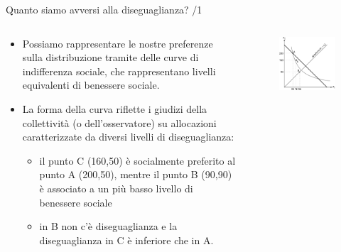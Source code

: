 \documentclass[aspectratio=64,11pt]{beamer}
\begin{document}
\begin{frame}{Quanto siamo avversi alla diseguaglianza? /1}
\begin{columns}
\begin{column}{.5\columnwidth}
\begin{itemize}
\item Possiamo rappresentare le nostre preferenze sulla distribuzione tramite
delle \alert{curve di indifferenza sociale}, che rappresentano livelli equivalenti
di benessere sociale.
\item La forma della curva riflette i giudizi della collettività (o
dell'osservatore) su allocazioni caratterizzate da diversi livelli di
diseguaglianza:
\begin{itemize}
\item il punto C (160,50) è socialmente preferito al punto A (200,50), mentre il
punto B (90,90) è associato a un più basso livello di benessere sociale
\item in B non c'è diseguaglianza e la diseguaglianza in C è inferiore che in A.
\end{itemize}
\end{itemize}
\end{column}

\begin{column}{.5\columnwidth}
\begin{figure}[htbp]
\centering
\includegraphics[width=\textwidth]{./figure/fbs-0.pdf}
\end{figure}
\end{column}
\end{columns}
\end{frame}
\end{document}
